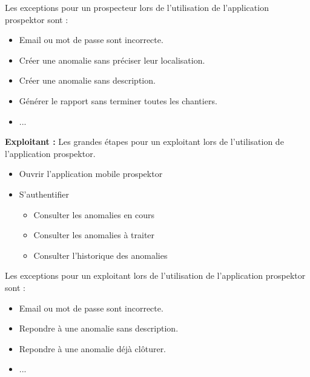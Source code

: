 Les exceptions pour un prospecteur lors de l'utilisation de l'application prospektor sont :

\begin{itemize}
\item Email ou mot de passe sont incorrecte.
\item Cr\'eer une anomalie sans pr\'eciser leur localisation.
\item Cr\'eer une anomalie sans description.
\item G\'en\'erer le rapport sans terminer toutes les chantiers.
\item ...
\end{itemize}


\textbf{Exploitant :} Les grandes \'etapes pour un exploitant lors de l'utilisation de l'application prospektor.
\begin{itemize}
  \item Ouvrir l'application mobile prospektor
  \item S'authentifier
  \begin{itemize}
    \item Consulter les anomalies en cours
    \item Consulter les anomalies \`a traiter
    \item Consulter l'historique des anomalies
  \end{itemize}
\end{itemize}

Les exceptions pour un exploitant lors de l'utilisation de l'application prospektor sont :
\begin{itemize}
\item Email ou mot de passe sont incorrecte.
\item Repondre \`a une anomalie sans description.
\item Repondre \`a une anomalie d\'ej\`a cl\^oturer.
\item ...
\end{itemize}

